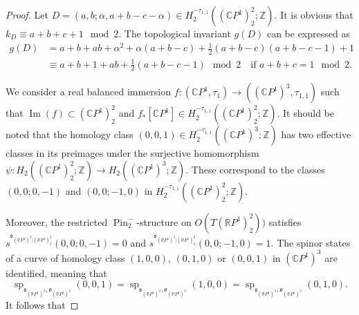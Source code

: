 \documentclass[11pt]{amsart}
\numberwithin{equation}{section}
\theoremstyle{definition}
\theoremstyle{plain}
\theoremstyle{remark}
\newcommand{\R}{\mathbb{R}}
\newcommand{\Z}{\mathbb{Z}}
\newcommand{\C}{\mathbb{C}}
\DeclareMathOperator{\Pin}{Pin}
\renewcommand{\Im}{\operatorname{Im}}
\renewcommand{\sp}{\operatorname{sp}}
\begin{document}
 \begin{proof}
Let $D=(a,b;\alpha,a+b-c-\alpha)\in H_2^{-\tau_{1,1}}((\C P^1)^2_2;\Z)$. 
It is obvious that $k_D\equiv a+b+c+1 \mod 2$. The topological invariant $g(D)$ can be expressed as
        \begin{align*}
        g(D)&=a+b+ab+
    \alpha^2+ \alpha(a+b-c)+\tfrac{1}{2}(a+b-c)(a+b-c-1)+1\\
        & \equiv    a+b+1+ab+\tfrac{1}{2}(a+b-c-1)\mod 2 \quad \text{if } a+b+c=1 \mod 2. 
    \end{align*}



We consider a real  balanced immersion $f\colon (\C P^1,\tau_1) \to ((\C P^1)^3,\tau_{1,1})$ such that $\Im(f)\subset (\C P^1)_2^2$ and $f_*[\C P^1]\in H_2^{-\tau_{1,1}}((\C P^1)^2_2;\Z)$. It should be noted that the homology class $(0,0,1)\in H_2^{-\tau_{1,1}}((\C P^1)^3;\Z)$ has two effective classes in its preimages under the surjective homomorphism $\psi\colon H_2((\C P^1)^2_2;\Z)\to H_2((\C P^1)^3;\Z)$. These correspond to the classes $(0,0;0,-1)$ and $(0,0;-1,0)$ in $H_2^{-\tau_{1,1}}( (\C P^1)^2_2;\Z)$.



Moreover, the restricted $\Pin^-_2$-structure  on $O(T (\R P^1)^2_2))$ satisfies  $s^{\mathfrak{s}_{(\R P^1)^3|(\R P^1)^2_2}}(0,0;0,-1)=0$ and $s^{\mathfrak{s}_{(\R P^1)^3|(\R P^1)^2_2}}(0,0;-1,0)=1$. 
The spinor states of a  curve of homology class  $(1,0,0)$, $(0,1,0)$ or $(0,0,1)$ in $(\C P^1)^3$ are identified, meaning that
$$\sp_{\mathfrak{s}_{(\R P^1)^3},\mathfrak{o}_{(\R P^1)^3}}(0,0,1)=\sp_{\mathfrak{s}_{(\R P^1)^3},\mathfrak{o}_{(\R P^1)^3}}(1,0,0)=\sp_{\mathfrak{s}_{(\R P^1)^3},\mathfrak{o}_{(\R P^1)^3}}(0,1,0).$$ It follows that


\end{proof}
\end{document}
